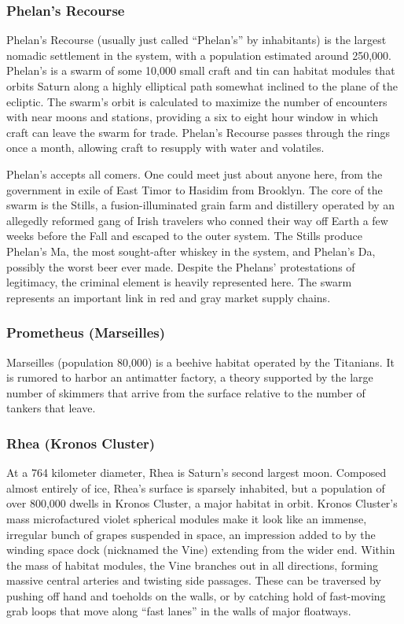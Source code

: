\subsubsection{Phelan's Recourse} \label{sec:phelans-recourse} 

Phelan's Recourse (usually just called “Phelan's” by inhabitants) is the largest nomadic settlement in the system, with a population estimated around 250,000. Phelan's is a swarm of some 10,000 small craft and tin can habitat modules that orbits Saturn along a highly elliptical path somewhat inclined to the plane of the ecliptic. The swarm's orbit is calculated to maximize the number of encounters with near moons and stations, providing a six to eight hour window in which craft can leave the swarm for trade. Phelan's Recourse passes through the rings once a month, allowing craft to resupply with water and volatiles. 

Phelan's accepts all comers. One could meet just about anyone here, from the government in exile of East Timor to Hasidim from Brooklyn. The core of the swarm is the Stills, a fusion-illuminated grain farm and distillery operated by an allegedly reformed gang of Irish travelers who conned their way off Earth a few weeks before the Fall and escaped to the outer system. The Stills produce Phelan's Ma, the most sought-after whiskey in the system, and Phelan's Da, possibly the worst beer ever made. Despite the Phelans' protestations of legitimacy, the criminal element is heavily represented here. The swarm represents an important link in red and gray market supply chains. 

\subsubsection{Prometheus (Marseilles)} \label{sec:prom-mars} 

Marseilles (population 80,000) is a beehive habitat operated by the Titanians. It is rumored to harbor an antimatter factory, a theory supported by the large number of skimmers that arrive from the surface relative to the number of tankers that leave. 

\subsubsection{Rhea (Kronos Cluster)} \label{sec:rhea-kronos-cluster} 

At a 764 kilometer diameter, Rhea is Saturn's second largest moon. Composed almost entirely of ice, Rhea's surface is sparsely inhabited, but a population of over 800,000 dwells in Kronos Cluster, a major habitat in orbit. Kronos Cluster's mass microfactured violet spherical modules make it look like an immense, irregular bunch of grapes suspended in space, an impression added to by the winding space dock (nicknamed the Vine) extending from the wider end. Within the mass of habitat modules, the Vine branches out in all directions, forming massive central arteries and twisting side passages. These can be traversed by pushing off hand and toeholds on the walls, or by catching hold of fast-moving grab loops that move along “fast lanes” in the walls of major floatways. 

